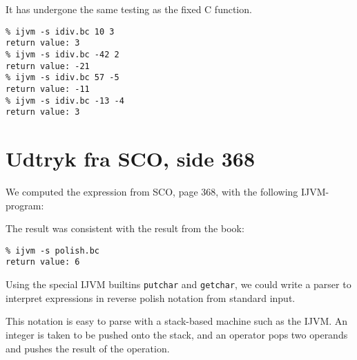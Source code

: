 \documentclass[12pt,a4paper]{article}
\begin{document}
\lstset{language=JVMIS}


It has undergone the same testing as the fixed C function.

\lstset{language=sh,numbers=none}
\begin{lstlisting}
% ijvm -s idiv.bc 10 3
return value: 3
% ijvm -s idiv.bc -42 2
return value: -21
% ijvm -s idiv.bc 57 -5
return value: -11
% ijvm -s idiv.bc -13 -4
return value: 3
\end{lstlisting}

\section{Udtryk fra SCO, side 368}
We computed the expression from SCO, page 368, with the following IJVM-program:
\lstset{language=JVMIS,numbers=left}


The result was consistent with the result from the book:
\lstset{language=sh,numbers=none}
\begin{lstlisting}
% ijvm -s polish.bc
return value: 6
\end{lstlisting}

Using the special IJVM builtins \texttt{putchar} and \texttt{getchar}, we could
write a parser to interpret expressions in reverse polish notation from
standard input.

This notation is easy to parse with a stack-based machine such as the IJVM. An
integer is taken to be pushed onto the stack, and an operator pops two operands
and pushes the result of the operation.
\end{document}
